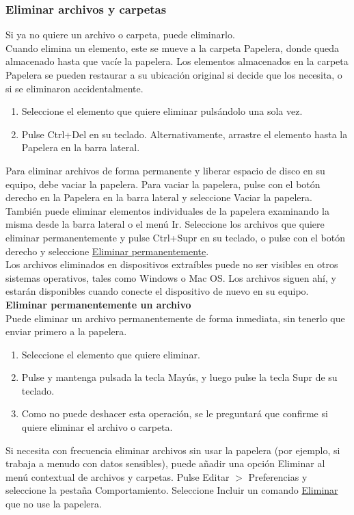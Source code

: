 \subsubsection{Eliminar archivos y carpetas}
Si ya no quiere un archivo o carpeta, puede eliminarlo.\\
Cuando elimina un elemento, este se mueve a la carpeta Papelera, donde queda almacenado hasta que vacíe la papelera. Los elementos almacenados en la carpeta Papelera se pueden restaurar a su ubicación original si decide que los necesita, o si se eliminaron accidentalmente.
\begin{enumerate}
\item  Seleccione el elemento que quiere eliminar pulsándolo una sola vez.
\item Pulse Ctrl+Del en su teclado. Alternativamente, arrastre el elemento hasta la Papelera en la barra lateral.
\end{enumerate}
Para eliminar archivos de forma permanente y liberar espacio de disco en su equipo, debe vaciar la papelera. Para vaciar la papelera, pulse con el botón derecho en la Papelera en la barra lateral y seleccione Vaciar la papelera. También puede eliminar elementos individuales de la papelera examinando la misma desde la barra lateral o el menú Ir. Seleccione los archivos que quiere eliminar permanentemente y pulse Ctrl+Supr en su teclado, o pulse con el botón derecho y seleccione \underline{Eliminar permanentemente}.\\

Los archivos eliminados en dispositivos extraíbles puede no ser visibles en otros sistemas operativos, tales como Windows o Mac OS. Los archivos siguen ahí, y estarán disponibles cuando conecte el dispositivo de nuevo en su equipo.\\

{\bf Eliminar permanentemente un archivo}\\
Puede eliminar un archivo permanentemente de forma inmediata, sin tenerlo que enviar primero a la papelera.
\begin{enumerate}
\item Seleccione el elemento que quiere eliminar.
\item Pulse y mantenga pulsada la tecla Mayús, y luego pulse la tecla Supr de su teclado.
\item Como no puede deshacer esta operación, se le preguntará que confirme si quiere eliminar el archivo o carpeta.
\end{enumerate}
Si necesita con frecuencia eliminar archivos sin usar la papelera (por ejemplo, si trabaja a menudo con datos sensibles), puede añadir una opción Eliminar al menú contextual de archivos y carpetas. Pulse Editar $>$ Preferencias y seleccione la pestaña Comportamiento. Seleccione Incluir un comando \underline{Eliminar} que no use la papelera.


